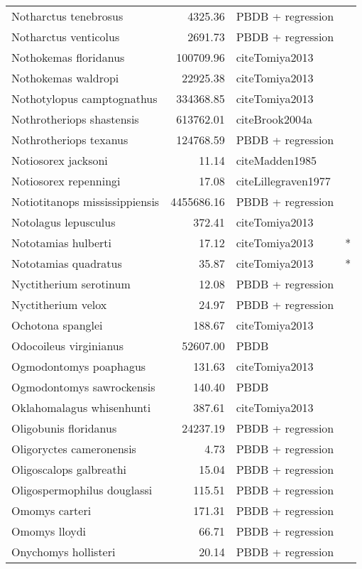 \begin{table}[ht]
\begin{tabular}{lrll}
  Notharctus tenebrosus & 4325.36 & PBDB + regression &  \\ 
  Notharctus venticolus & 2691.73 & PBDB + regression &  \\ 
  Nothokemas floridanus & 100709.96 & cite{Tomiya2013} &  \\ 
  Nothokemas waldropi & 22925.38 & cite{Tomiya2013} &  \\ 
  Nothotylopus camptognathus & 334368.85 & cite{Tomiya2013} &  \\ 
  Nothrotheriops shastensis & 613762.01 & cite{Brook2004a} &  \\ 
  Nothrotheriops texanus & 124768.59 & PBDB + regression &  \\ 
  Notiosorex jacksoni & 11.14 & cite{Madden1985} &  \\ 
  Notiosorex repenningi & 17.08 & cite{Lillegraven1977} &  \\ 
  Notiotitanops mississippiensis & 4455686.16 & PBDB + regression &  \\ 
  Notolagus lepusculus & 372.41 & cite{Tomiya2013} &  \\ 
  Nototamias hulberti & 17.12 & cite{Tomiya2013} & * \\ 
  Nototamias quadratus & 35.87 & cite{Tomiya2013} & * \\ 
  Nyctitherium serotinum & 12.08 & PBDB + regression &  \\ 
  Nyctitherium velox & 24.97 & PBDB + regression &  \\ 
  Ochotona spanglei & 188.67 & cite{Tomiya2013} &  \\ 
  Odocoileus virginianus & 52607.00 & PBDB &  \\ 
  Ogmodontomys poaphagus & 131.63 & cite{Tomiya2013} &  \\ 
  Ogmodontomys sawrockensis & 140.40 & PBDB &  \\ 
  Oklahomalagus whisenhunti & 387.61 & cite{Tomiya2013} &  \\ 
  Oligobunis floridanus & 24237.19 & PBDB + regression &  \\ 
  Oligoryctes cameronensis & 4.73 & PBDB + regression &  \\ 
  Oligoscalops galbreathi & 15.04 & PBDB + regression &  \\ 
  Oligospermophilus douglassi & 115.51 & PBDB + regression &  \\ 
  Omomys carteri & 171.31 & PBDB + regression &  \\ 
  Omomys lloydi & 66.71 & PBDB + regression &  \\ 
  Onychomys hollisteri & 20.14 & PBDB + regression &  \\ 

\end{tabular}
\end{table}
